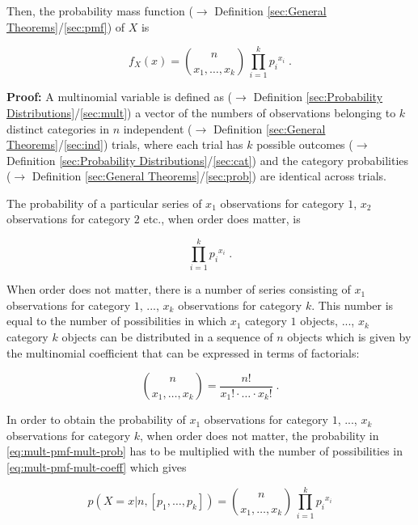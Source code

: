 \documentclass[a4paper,12pt,twoside]{book}
\begin{document}
Then, the probability mass function ($\rightarrow$ Definition \ref{sec:General Theorems}/\ref{sec:pmf}) of $X$ is

\begin{equation} \label{eq:mult-pmf-mult-pmf}
f_X(x) = {n \choose {x_1, \ldots, x_k}} \, \prod_{i=1}^k {p_i}^{x_i} \; .
\end{equation}


\vspace{1em}
\textbf{Proof:} A multinomial variable is defined as ($\rightarrow$ Definition \ref{sec:Probability Distributions}/\ref{sec:mult}) a vector of the numbers of observations belonging to $k$ distinct categories in $n$ independent ($\rightarrow$ Definition \ref{sec:General Theorems}/\ref{sec:ind}) trials, where each trial has $k$ possible outcomes ($\rightarrow$ Definition \ref{sec:Probability Distributions}/\ref{sec:cat}) and the category probabilities ($\rightarrow$ Definition \ref{sec:General Theorems}/\ref{sec:prob}) are identical across trials.

The probability of a particular series of $x_1$ observations for category $1$, $x_2$ observations for category $2$ etc., when order does matter, is

\begin{equation} \label{eq:mult-pmf-mult-prob}
\prod_{i=1}^k {p_i}^{x_i} \; .
\end{equation}

When order does not matter, there is a number of series consisting of $x_1$ observations for category $1$, ..., $x_k$ observations for category $k$. This number is equal to the number of possibilities in which $x_1$ category $1$ objects, ..., $x_k$ category $k$ objects can be distributed in a sequence of $n$ objects which is given by the multinomial coefficient that can be expressed in terms of factorials:

\begin{equation} \label{eq:mult-pmf-mult-coeff}
{n \choose {x_1, \ldots, x_k}} = \frac{n!}{x_1! \cdot \ldots \cdot x_k!} \; .
\end{equation}

In order to obtain the probability of $x_1$ observations for category $1$, ..., $x_k$ observations for category $k$, when order does not matter, the probability in \eqref{eq:mult-pmf-mult-prob} has to be multiplied with the number of possibilities in \eqref{eq:mult-pmf-mult-coeff} which gives

\begin{equation} \label{eq:mult-pmf-mult-pmf-qed}
p(X=x|n,\left[p_1, \ldots, p_k \right]) = {n \choose {x_1, \ldots, x_k}} \, \prod_{i=1}^k {p_i}^{x_i}
\end{equation}
\end{document}
